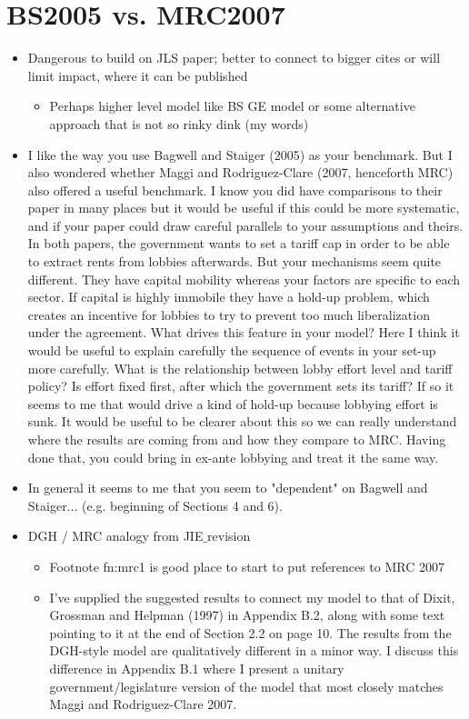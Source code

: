\documentclass[12pt]{article}
\begin{document}
\section{BS2005 vs. MRC2007}
	\begin{itemize}
		\item Dangerous to build on JLS paper; better to connect to bigger cites or will limit impact, where it can be published
			\begin{itemize}
				\item Perhaps higher level model like BS GE model or some alternative approach that is not so rinky dink (my words)
			\end{itemize}
		\item I like the way you use Bagwell and Staiger (2005) as your benchmark.  But I also wondered whether Maggi and Rodriguez-Clare (2007, henceforth MRC) also offered a useful benchmark.  I know you did have comparisons to their paper in many places but it would be useful if this could be more systematic, and if your paper could draw careful parallels to your assumptions and theirs.  In both papers, the government wants to set a tariff cap in order to be able to extract rents from lobbies afterwards.  But your mechanisms seem quite different.  They have capital mobility whereas your factors are specific to each sector.  If capital is highly immobile they have a hold-up problem, which creates an incentive for lobbies to try to prevent too much liberalization under the agreement.  What drives this feature in your model?  Here I think it would be useful to explain carefully the sequence of events in your set-up more carefully.  What is the relationship between lobby effort level and tariff policy?  Is effort fixed first, after which the government sets its tariff?  If so it seems to me that would drive a kind of hold-up because lobbying effort is sunk.  It would be useful to be clearer about this so we can really understand where the results are coming from and how they compare to MRC.  Having done that, you could bring in ex-ante lobbying and treat it the same way. 
		\item In general it seems to me that you seem to "dependent" on Bagwell and Staiger... (e.g. beginning of Sections 4 and 6).
		\item DGH / MRC analogy from JIE$\_$revision
			\begin{itemize}
				\item Footnote fn:mrc1 is good place to start to put references to MRC 2007
				\item I've supplied the suggested results to connect my model to that of Dixit, Grossman and Helpman (1997) in Appendix B.2, along with some text pointing to it at the end of Section 2.2 on page 10. The results from the DGH-style model are qualitatively different in a minor way. I discuss this difference in Appendix B.1 where I present a unitary government/legislature version of the model that most closely matches Maggi and Rodriguez-Clare 2007.

\end{itemize}
\end{itemize}
\end{document}
